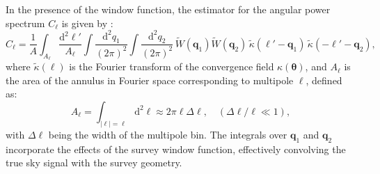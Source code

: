 In the presence of the window function, the estimator for the angular power spectrum \( C_\ell \) is given by \citep{PhysRevD.87.123504}:
\begin{equation}
    \hat{C}_\ell = \frac{1}{A} \int_{A_\ell} \frac{\mathrm{d}^2 \ell'}{A_\ell} \int \frac{\mathrm{d}^2 q_1}{(2\pi)^2} \int \frac{\mathrm{d}^2 q_2}{(2\pi)^2} \, \tilde{W}(\mathbf{q}_1) \tilde{W}(\mathbf{q}_2) \, \tilde{\kappa}(\boldsymbol{\ell}' - \mathbf{q}_1) \, \tilde{\kappa}(-\boldsymbol{\ell}' - \mathbf{q}_2),
\end{equation}
where \( \tilde{\kappa}(\boldsymbol{\ell}) \) is the Fourier transform of the convergence field \( \kappa(\boldsymbol{\theta}) \), and \( A_\ell \) is the area of the annulus in Fourier space corresponding to multipole \( \ell \), defined as:
\begin{equation}
    A_\ell = \int_{|\boldsymbol{\ell}| = \ell} \mathrm{d}^2 \boldsymbol{\ell} \approx 2 \pi \ell \Delta \ell, \quad (\Delta \ell / \ell \ll 1),
\end{equation}
with \( \Delta \ell \) being the width of the multipole bin. The integrals over \( \mathbf{q}_1 \) and \( \mathbf{q}_2 \) incorporate the effects of the survey window function, effectively convolving the true sky signal with the survey geometry.

